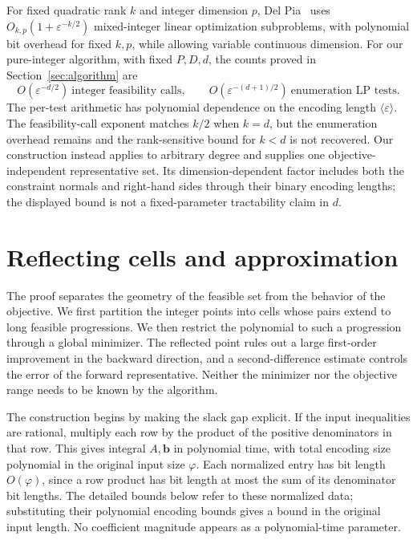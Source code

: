 \documentclass[11pt]{article}
\theoremstyle{definition}\newtheorem{definition}{Definition}[section]
\theoremstyle{remark}\newtheorem{remark}[theorem]{Remark}
\newcommand{\eps}{\varepsilon}
\begin{document}
For fixed quadratic rank $k$ and integer dimension $p$, Del Pia~\cite[Proposition~3 and Section~6.2]{DelPia} uses $O_{k,p}(1+\eps^{-k/2})$ mixed-integer linear optimization subproblems, with polynomial bit overhead for fixed $k,p$, while allowing variable continuous dimension. For our pure-integer algorithm, with fixed $P,D,d$, the counts proved in Section~\ref{sec:algorithm} are
\[
 O(\eps^{-d/2})\ \text{integer feasibility calls},\qquad
 O(\eps^{-(d+1)/2})\ \text{enumeration LP tests}.
\]
The per-test arithmetic has polynomial dependence on the encoding length $\langle\eps\rangle$. The feasibility-call exponent matches $k/2$ when $k=d$, but the enumeration overhead remains and the rank-sensitive bound for $k<d$ is not recovered. Our construction instead applies to arbitrary degree and supplies one objective-independent representative set. Its dimension-dependent factor includes both the constraint normals and right-hand sides through their binary encoding lengths; the displayed bound is not a fixed-parameter tractability claim in $d$.

\section{Reflecting cells and approximation}\label{sec:cover}

The proof separates the geometry of the feasible set from the behavior of the objective. We first partition the integer points into cells whose pairs extend to long feasible progressions. We then restrict the polynomial to such a progression through a global minimizer. The reflected point rules out a large first-order improvement in the backward direction, and a second-difference estimate controls the error of the forward representative. Neither the minimizer nor the objective range needs to be known by the algorithm.

The construction begins by making the slack gap explicit. If the input inequalities are rational, multiply each row by the product of the positive denominators in that row. This gives integral $A,\mathbf b$ in polynomial time, with total encoding size polynomial in the original input size $\varphi$. Each normalized entry has bit length $O(\varphi)$, since a row product has bit length at most the sum of its denominator bit lengths. The detailed bounds below refer to these normalized data; substituting their polynomial encoding bounds gives a bound in the original input length. No coefficient magnitude appears as a polynomial-time parameter.
\end{document}
